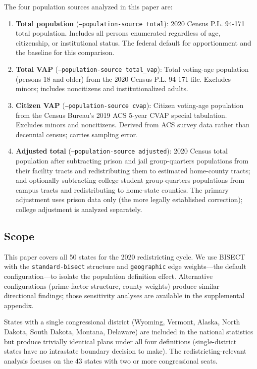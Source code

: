 The four population sources analyzed in this paper are:
\begin{enumerate}
    \item \textbf{Total population} (\texttt{--population-source total}): 2020 Census P.L. 94-171 total population. Includes all persons enumerated regardless of age, citizenship, or institutional status. The federal default for apportionment and the baseline for this comparison.

    \item \textbf{Total VAP} (\texttt{--population-source total\_vap}): Total voting-age population (persons 18 and older) from the 2020 Census P.L. 94-171 file. Excludes minors; includes noncitizens and institutionalized adults.

    \item \textbf{Citizen VAP} (\texttt{--population-source cvap}): Citizen voting-age population from the Census Bureau's 2019 ACS 5-year CVAP special tabulation. Excludes minors and noncitizens. Derived from ACS survey data rather than decennial census; carries sampling error.

    \item \textbf{Adjusted total} (\texttt{--population-source adjusted}): 2020 Census total population after subtracting prison and jail group-quarters populations from their facility tracts and redistributing them to estimated home-county tracts; and optionally subtracting college student group-quarters populations from campus tracts and redistributing to home-state counties. The primary adjustment uses prison data only (the more legally established correction); college adjustment is analyzed separately.
\end{enumerate}

\subsection{Scope}

This paper covers all 50 states for the 2020 redistricting cycle. We use BISECT with the \texttt{standard-bisect} structure and \texttt{geographic} edge weights---the default configuration---to isolate the population definition effect. Alternative configurations (prime-factor structure, county weights) produce similar directional findings; those sensitivity analyses are available in the supplemental appendix.

States with a single congressional district (Wyoming, Vermont, Alaska, North Dakota, South Dakota, Montana, Delaware) are included in the national statistics but produce trivially identical plans under all four definitions (single-district states have no intrastate boundary decision to make). The redistricting-relevant analysis focuses on the 43 states with two or more congressional seats.

